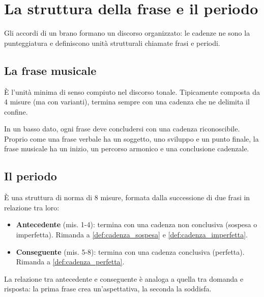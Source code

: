 \chapter{La struttura della frase e il periodo}
\label{chap:struttura_frase}

Gli accordi di un brano formano un discorso organizzato: le cadenze ne sono la punteggiatura e definiscono unità strutturali chiamate frasi e periodi.

\section{La frase musicale}
\label{sec:frase_musicale}

\begin{definizione}
    È l'unità minima di senso compiuto nel discorso tonale. Tipicamente composta da 4 misure (ma con varianti), termina sempre con una cadenza che ne delimita il confine.
\end{definizione}

\begin{regola}
    In un basso dato, ogni frase deve concludersi con una cadenza riconoscibile. Proprio come una frase verbale ha un soggetto, uno sviluppo e un punto finale, la frase musicale ha un inizio, un percorso armonico e una conclusione cadenzale.
\end{regola}

\section{Il periodo}
\label{sec:periodo}

\begin{definizione}[Il periodo]
    È una struttura di norma di 8 misure, formata dalla successione di due frasi in relazione tra loro:
    \begin{itemize}
        \item \textbf{Antecedente} (mis. 1-4): termina con una cadenza non conclusiva (sospesa o imperfetta). Rimanda a \ref{def:cadenza_sospesa} e \ref{def:cadenza_imperfetta}.
        \item \textbf{Conseguente} (mis. 5-8): termina con una cadenza conclusiva (perfetta). Rimanda a \ref{def:cadenza_perfetta}.
    \end{itemize}
\end{definizione}

La relazione tra antecedente e conseguente è analoga a quella tra domanda e risposta: la prima frase crea un'aspettativa, la seconda la soddisfa.

